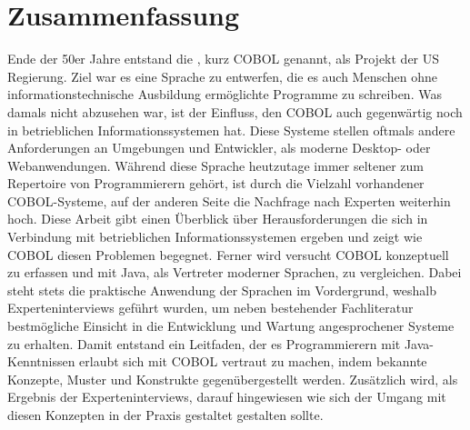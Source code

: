 \chapter*{Zusammenfassung} 

Ende der 50er Jahre entstand die , kurz COBOL genannt, als Projekt der US Regierung. Ziel war es eine Sprache zu entwerfen, die es auch Menschen ohne informationstechnische Ausbildung ermöglichte Programme zu schreiben. Was damals nicht abzusehen war, ist der Einfluss, den COBOL auch gegenwärtig noch in betrieblichen Informationssystemen hat. Diese Systeme stellen oftmals andere Anforderungen an Umgebungen und Entwickler, als moderne Desktop- oder Webanwendungen. Während diese Sprache heutzutage immer seltener zum Repertoire von Programmierern gehört, ist durch die Vielzahl vorhandener COBOL-Systeme, auf der anderen Seite die Nachfrage nach Experten weiterhin hoch. Diese Arbeit gibt einen Überblick über Herausforderungen die sich in Verbindung mit betrieblichen Informationssystemen ergeben und zeigt wie COBOL diesen Problemen begegnet. Ferner wird versucht COBOL konzeptuell zu erfassen und mit Java, als Vertreter moderner Sprachen, zu vergleichen. Dabei steht stets die praktische Anwendung der Sprachen im Vordergrund, weshalb Experteninterviews geführt wurden, um neben bestehender Fachliteratur bestmögliche Einsicht in die Entwicklung und Wartung angesprochener Systeme zu erhalten. Damit entstand ein Leitfaden, der es Programmierern mit Java-Kenntnissen erlaubt sich mit COBOL vertraut zu machen, indem bekannte Konzepte, Muster und Konstrukte gegenübergestellt werden. Zusätzlich wird, als Ergebnis der Experteninterviews, darauf hingewiesen wie sich der Umgang mit diesen Konzepten in der Praxis gestaltet \bzw gestalten sollte. 